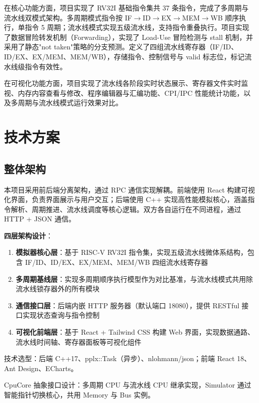 \documentclass[12pt, a4paper]{article}
\begin{document}
在核心功能方面，项目实现了 RV32I 基础指令集共 37 条指令，完成了多周期与流水线双模式架构。多周期模式指令按 IF$\rightarrow$ID$\rightarrow$EX$\rightarrow$MEM$\rightarrow$WB 顺序执行，单指令 5 周期；流水线模式实现五级流水线，支持指令重叠执行。项目实现了数据冒险转发机制（Forwarding），实现了 Load-Use 冒险检测与 stall 机制，并采用了静态"not taken"策略的分支预测。定义了四组流水线寄存器（IF/ID、ID/EX、EX/MEM、MEM/WB），存储指令、控制信号与 valid 标志位，标记流水线级指令有效性。

在可视化功能方面，项目实现了流水线各阶段实时状态展示、寄存器文件实时监视、内存内容查看与修改、程序编辑器与汇编功能、CPI/IPC 性能统计功能，以及多周期与流水线模式运行效果对比。

\vspace{1cm}

\section{技术方案}\label{sec:tech}

\subsection{整体架构}

本项目采用前后端分离架构，通过 RPC 通信实现解耦。前端使用 React 构建可视化界面，负责界面展示与用户交互；后端使用 C++ 实现高性能模拟核心，涵盖指令解析、周期推进、流水线调度等核心逻辑。双方各自运行在不同进程，通过 HTTP + JSON 通信。

\textbf{四层架构设计}：

\begin{enumerate}[leftmargin=*, label={}]
\item \textbf{模拟器核心层}：基于 RISC-V RV32I 指令集，实现五级流水线微体系结构，包含 IF/ID、ID/EX、EX/MEM、MEM/WB 四组流水线寄存器
\item \textbf{多周期基线层}：实现多周期顺序执行模型作为对比基准，与流水线模式共用除流水线锁存器外的所有模块
\item \textbf{通信接口层}：后端内嵌 HTTP 服务器（默认端口 18080），提供 RESTful 接口实现状态查询与指令控制
\item \textbf{可视化前端层}：基于 React + Tailwind CSS 构建 Web 界面，实现数据通路、流水线时间轴、寄存器面板等可视化组件
\end{enumerate}

技术选型：后端 C++17、pplx::Task（异步）、nlohmann/json；前端 React 18、Ant Design、ECharts。

CpuCore 抽象接口设计：多周期 CPU 与流水线 CPU 继承实现，Simulator 通过智能指针切换核心，共用 Memory 与 Bus 实例。
\end{document}
